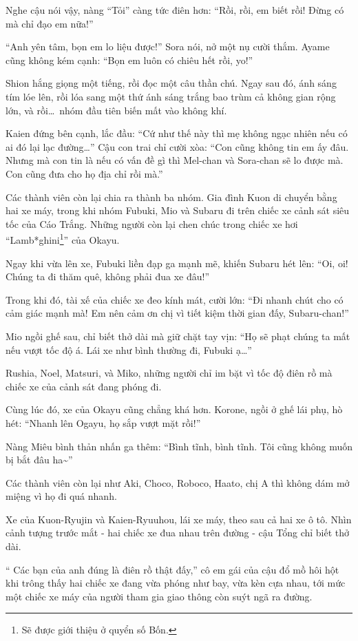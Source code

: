 \documentclass[../main.tex]{subfiles}
\begin{document}
Nghe cậu nói vậy, nàng ``Tỏi'' càng tức điên hơn: ``Rồi, rồi, em biết rồi! Đừng có mà chỉ đạo em nữa!''

``Anh yên tâm, bọn em lo liệu được!'' Sora nói, nở một nụ cười thắm. Ayame cũng không kém cạnh: ``Bọn em luôn có chiêu hết rồi, yo!''

Shion hắng giọng một tiếng, rồi đọc một câu thần chú. Ngay sau đó, ánh sáng tím lóe lên, rồi lóa sang một thứ ánh sáng trắng bao trùm cả không gian rộng lớn, và rồi\dots\ nhóm đầu tiên biến mất vào không khí.

Kaien đứng bên cạnh, lắc đầu: ``Cứ như thế này thì mẹ không ngạc nhiên nếu có ai đó lại lạc đường\dots'' Cậu con trai chỉ cười xòa: ``Con cũng không tin em ấy đâu. Nhưng mà con tin là nếu có vấn đề gì thì Mel-chan và Sora-chan sẽ lo được mà. Con cũng đưa cho họ địa chỉ rồi mà.''

Các thành viên còn lại chia ra thành ba nhóm. Gia đình Kuon di chuyển bằng hai xe máy, trong khi nhóm Fubuki, Mio và Subaru đi trên chiếc xe cảnh sát siêu tốc của Cáo Trắng. Những người còn lại chen chúc trong chiếc xe hơi ``Lamb*ghini\footnote{Sẽ được giới thiệu ở quyển số Bốn.}'' của Okayu.

Ngay khi vừa lên xe, Fubuki liền đạp ga mạnh mẽ, khiến Subaru hét lên: ``Oi, oi! Chúng ta đi thăm quê, không phải đua xe đâu!''

Trong khi đó, tài xế của chiếc xe đeo kính mát, cười lớn: ``Đi nhanh chút cho có cảm giác mạnh mà! Em nên cảm ơn chị vì tiết kiệm thời gian đấy, Subaru-chan!''

Mio ngồi ghế sau, chỉ biết thở dài mà giữ chặt tay vịn: ``Họ sẽ phạt chúng ta mất nếu vượt tốc độ á. Lái xe như bình thường đi, Fubuki ạ\dots''

Rushia, Noel, Matsuri, và Miko, những người chỉ im bặt vì tốc độ điên rồ mà chiếc xe của cảnh sát đang phóng đi.

Cùng lúc đó, xe của Okayu cũng chẳng khá hơn. Korone, ngồi ở ghế lái phụ, hò hét: ``Nhanh lên Ogayu, họ sắp vượt mặt rồi!''

Nàng Miêu bình thản nhấn ga thêm: ``Bình tĩnh, bình tĩnh. Tôi cũng không muốn bị bắt đâu ha\~{}''

Các thành viên còn lại như Aki, Choco, Roboco, Haato, chị A thì không dám mở miệng vì họ đi quá nhanh.

Xe của Kuon-Ryujin và Kaien-Ryuuhou, lái xe máy, theo sau cả hai xe ô tô. Nhìn cảnh tượng trước mắt - hai chiếc xe đua nhau trên đường - cậu Tổng chỉ biết thở dài.

``{\color{red} Các bạn của anh đúng là điên rồ thật đấy,}'' cô em gái của cậu đổ mồ hôi hột khi trông thấy hai chiếc xe đang vừa phóng như bay, vừa kèn cựa nhau, tới mức một chiếc xe máy của người tham gia giao thông còn suýt ngã ra đường.
\end{document}
